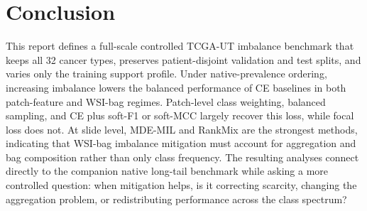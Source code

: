\documentclass[11pt]{article}
\begin{document}
\section{Conclusion}
This report defines a full-scale controlled TCGA-UT imbalance benchmark that keeps all 32 cancer types, preserves patient-disjoint validation and test splits, and varies only the training support profile. Under native-prevalence ordering, increasing imbalance lowers the balanced performance of CE baselines in both patch-feature and WSI-bag regimes. Patch-level class weighting, balanced sampling, and CE plus soft-F1 or soft-MCC largely recover this loss, while focal loss does not. At slide level, MDE-MIL and RankMix are the strongest methods, indicating that WSI-bag imbalance mitigation must account for aggregation and bag composition rather than only class frequency. The resulting analyses connect directly to the companion native long-tail benchmark while asking a more controlled question: when mitigation helps, is it correcting scarcity, changing the aggregation problem, or redistributing performance across the class spectrum?



\end{document}
